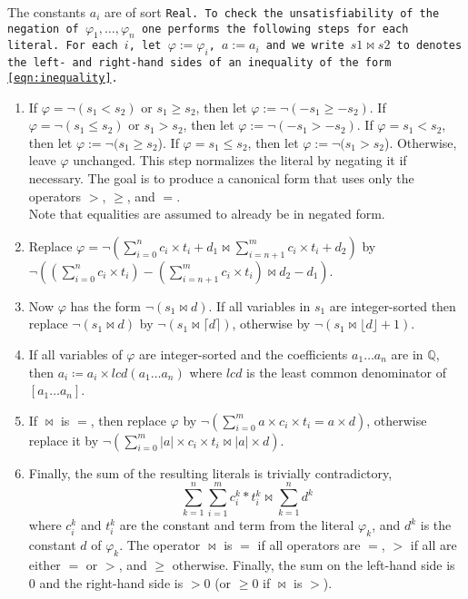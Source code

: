 The constants $a_i$ are of sort \tt{Real}. To check the unsatisfiability of the negation of $\varphi_1, \dots, \varphi_n$ one performs the following steps for each literal. For each $i$, let $\varphi := \varphi_i$, $a := a_i$ and
we write $s1 \bowtie s2$ to denotes the left- and right-hand sides of an inequality of the form \eqref{eqn:inequality}.

\begin{enumerate}
    \item If $\varphi =  \neg (s_1 < s_2)$  or $s_1 \geq s_2$, then let $\varphi := \neg(- s_1 \geq - s_2)$.
    If $\varphi =  \neg (s_1 \leq s_2)$ or $s_1 > s_2$, then let $\varphi := \neg(- s_1 > - s_2)$.
    If $\varphi = s_1 < s_2$, then let $\varphi := \neg(s_1 \geq s_2$).
    If $\varphi = s_1 \leq s_2$, then let $\varphi := \neg(s_1 > s_2$).
    Otherwise, leave $\varphi$ unchanged.
    This step normalizes the literal by negating it if necessary.
    The goal is to produce a canonical form that uses only the operators $>$, $\geq$, and $=$.\\
    Note that equalities are assumed to already be in negated form.


    \item Replace $\varphi = \neg (\sum_{i=0}^{n}c_i\times{}t_i + d_1 \bowtie \sum_{i=n+1}^{m} c_i\times{}t_i + d_2)$ by $\neg (\left(\sum_{i=0}^{n}c_i\times{}t_i\right) - \left(\sum_{i=n+1}^{m} c_i\times{}t_i\right)
    \bowtie d_2 - d_1)$.
    
    \item \label{la_generic:str}Now $\varphi$ has the form $\neg (s_1 \bowtie d)$. If all
    variables in $s_1$ are integer-sorted then replace $\neg (s_1 \bowtie d)$ by $\neg (s_1 \bowtie \lceil d \rceil)$,
    otherwise by $\neg (s_1 \bowtie \lfloor d\rfloor + 1)$.

    \item If all variables of $\varphi$ are integer-sorted and the coefficients $a_1 \dots a_n$ are in $\mathbb{Q}$,
    then $a_i \coloneq a_i \times \mathit{lcd}(a_1 \dots a_n)$ where $\mathit{lcd}$ is the least common denominator of $[a_1 \dots a_n]$.
    
    \item If $\bowtie$ is $=$, then replace $\varphi$ by
    $\neg (\sum_{i=0}^{m}a\times{}c_i\times{}t_i = a\times{}d)$, otherwise replace it by
    $\neg (\sum_{i=0}^{m}|a|\times{}c_i\times{}t_i \bowtie |a|\times{}d)$.

    \item Finally, the sum of the resulting literals is trivially contradictory,
    \[
        \sum_{k=1}^{n}\sum_{i=1}^{m}c_i^k*t_i^k \bowtie \sum_{k=1}^{n}d^k
    \]
  where $c_i^k$ and $t_i^k$ are the constant and term from the literal $\varphi_k$, and $d^k$ is the constant $d$ of $\varphi_k$.
  The operator $\bowtie$ is $=$ if all operators are $=$, $>$ if all are either $=$ or $>$, and $\geq$ otherwise. Finally, the sum on the left-hand side is $0$ and the right-hand side is $>0$ (or $\geq 0$ if $\bowtie$ is $>$).

\end{enumerate}


